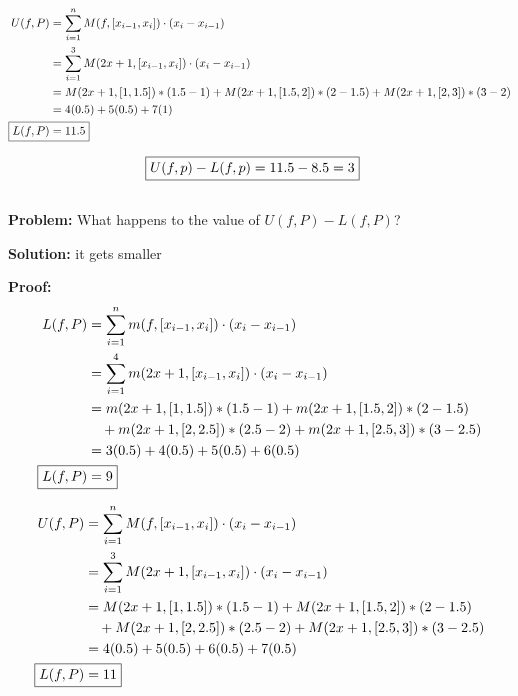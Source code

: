 \documentclass[]{article}
\begin{document}
\begin{align*}
    U(f,P) &= \sum_{i=1}^{n} M(f,[x_{i-1},x_i]) \cdot (x_i - x_{i-1})\\
        &= \sum_{i=1}^{3} M(2 x + 1,[x_{i-1},x_i]) \cdot (x_i - x_{i-1})\\
        &= M(2x + 1, [1, 1.5]) * (1.5 - 1)
            + M(2x + 1, [1.5, 2]) * (2 - 1.5)
            + M(2x + 1, [2, 3]) * (3 - 2)\\
        &= 4 (0.5) 
            + 5 (0.5)
            + 7 (1)\\
    \Aboxed{L(f,P) &= 11.5}
\end{align*}

\begin{align*}
    \Aboxed{U(f,p) - L(f,p) &= 11.5 - 8.5 = 3}
\end{align*}

\subsection{}
\textbf{Problem:}
What happens to the value of $U(f,P) - L(f,P)$?

\textbf{Solution:} it gets smaller

\textbf{Proof:} 
\begin{align*}
    L(f,P) &= \sum_{i=1}^{n} m(f,[x_{i-1},x_i]) \cdot (x_i - x_{i-1})\\
        &= \sum_{i=1}^{4} m(2 x + 1,[x_{i-1},x_i]) \cdot (x_i - x_{i-1})\\
        &= m(2x + 1, [1, 1.5]) * (1.5 - 1)
            + m(2x + 1, [1.5, 2]) * (2 - 1.5)\\
            &\quad+ m(2x + 1, [2, 2.5]) * (2.5 - 2)
                + m(2x + 1, [2.5, 3]) * (3 - 2.5)\\
        &= 3 (0.5) 
            + 4 (0.5)
            + 5 (0.5)
            + 6 (0.5)\\
    \Aboxed{L(f,P) &= 9}
\end{align*}

\begin{align*}
    U(f,P) &= \sum_{i=1}^{n} M(f,[x_{i-1},x_i]) \cdot (x_i - x_{i-1})\\
        &= \sum_{i=1}^{3} M(2 x + 1,[x_{i-1},x_i]) \cdot (x_i - x_{i-1})\\
        &= M(2x + 1, [1, 1.5]) * (1.5 - 1)
            + M(2x + 1, [1.5, 2]) * (2 - 1.5)\\
            &\quad+ M(2x + 1, [2, 2.5]) * (2.5 - 2)
                + M(2x + 1, [2.5, 3]) * (3 - 2.5)\\
        &= 4 (0.5) 
            + 5 (0.5)
            + 6 (0.5)
            + 7 (0.5)\\
    \Aboxed{L(f,P) &= 11}
\end{align*}
\end{document}
